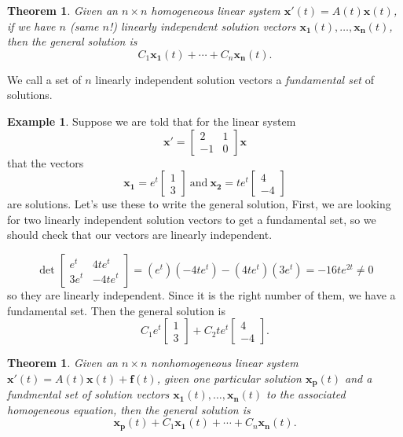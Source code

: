 \documentclass[12pt]{amsart}
\numberwithin{equation}{section}
\theoremstyle{plain} %
\newtheorem{thm}[equation]{Theorem}
\theoremstyle{definition}
\newtheorem{ex}[equation]{Example}
\theoremstyle{remark}
\begin{document}
\begin{thm} Given an $n\times n$ homogeneous linear system $\mathbf{x'}(t) =A(t) \mathbf{x}(t)$, if we have $n$ (same $n$!) linearly independent solution vectors $\mathbf{x_1}(t),\dots,\mathbf{x_n}(t)$, then the general solution is
\[ C_1 \mathbf{x_1}(t) +\cdots + C_n \mathbf{x_n}(t).\]
\end{thm}

We call a set of $n$ linearly independent solution vectors a \emph{fundamental set} of solutions.

\begin{ex} Suppose we are told that for the linear system 
\[ \mathbf{x'} = \begin{bmatrix} 2 & 1 \\ -1 & 0\end{bmatrix} \mathbf{x}\] that the vectors 
\[ \mathbf{x_1} = e^{t} \begin{bmatrix} 1\\3 \end{bmatrix} \ \text{and} \ \mathbf{x_2} = te^{t} \begin{bmatrix} 4\\-4 \end{bmatrix}\]
are solutions. Let's use these to write the general solution, First, we are looking for two linearly independent solution vectors to get a fundamental set, so we should check that our vectors are linearly independent.

\[ \det\begin{bmatrix} e^t & 4 t e^t \\ 3 e^t & -4 t e^t\end{bmatrix} = (e^t)(-4 t e^t) - (4 t e^t)(3 e^t) = -16 t e^{2t} \neq 0\]
so they are linearly independent. Since it is the right number of them, we have a fundamental set. Then the general solution is
\[ C_1 e^{t} \begin{bmatrix} 1\\3 \end{bmatrix} + C_2 te^{t} \begin{bmatrix} 4\\-4 \end{bmatrix}.\]
\end{ex}

\begin{thm} Given an $n\times n$ nonhomogeneous linear system $\mathbf{x'}(t) =A(t) \mathbf{x}(t) + \mathbf{f}(t)$, given one particular solution $\mathbf{x_p}(t)$ and
a fundmental set of solution vectors $\mathbf{x_1}(t),\dots,\mathbf{x_n}(t)$ to the associated homogeneous equation, then the general solution is
\[ \mathbf{x_p}(t) + C_1 \mathbf{x_1}(t) +\cdots + C_n \mathbf{x_n}(t).\]
\end{thm}
\end{document}
